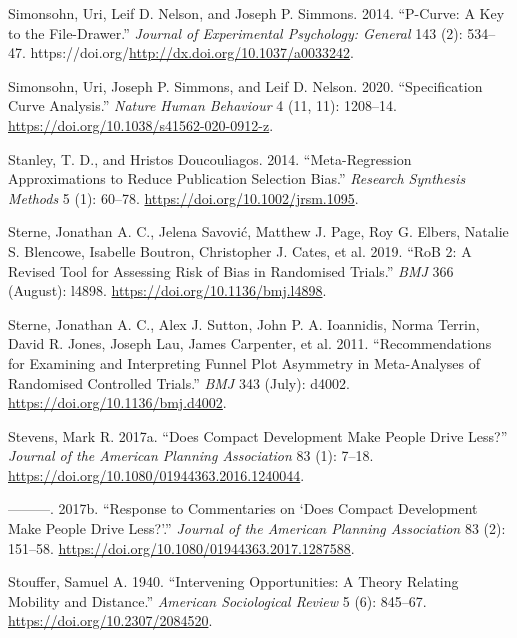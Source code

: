 \documentclass[
  11pt,
  openany]{memoir}
\newlength{\cslhangindent}
\newlength{\cslentryspacingunit} %
\newenvironment{CSLReferences}[2] %
 {%
  \setlength{\parindent}{0pt}
  \ifodd #1
  \let\oldpar\par
  \def\par{\hangindent=\cslhangindent\oldpar}
  \fi
  \setlength{\parskip}{#2\cslentryspacingunit}
 }%
 {}
\begin{document}
\begin{CSLReferences}{1}{0}
\leavevmode{}%
Simonsohn, Uri, Leif D. Nelson, and Joseph P. Simmons. 2014. {``P-Curve: A Key to the File-Drawer.''} \emph{Journal of Experimental Psychology: General} 143 (2): 534--47. https://doi.org/\url{http://dx.doi.org/10.1037/a0033242}.

\leavevmode{}%
Simonsohn, Uri, Joseph P. Simmons, and Leif D. Nelson. 2020. {``Specification Curve Analysis.''} \emph{Nature Human Behaviour} 4 (11, 11): 1208--14. \url{https://doi.org/10.1038/s41562-020-0912-z}.

\leavevmode{}%
Stanley, T. D., and Hristos Doucouliagos. 2014. {``Meta-Regression Approximations to Reduce Publication Selection Bias.''} \emph{Research Synthesis Methods} 5 (1): 60--78. \url{https://doi.org/10.1002/jrsm.1095}.

\leavevmode{}%
Sterne, Jonathan A. C., Jelena Savović, Matthew J. Page, Roy G. Elbers, Natalie S. Blencowe, Isabelle Boutron, Christopher J. Cates, et al. 2019. {``{RoB} 2: A Revised Tool for Assessing Risk of Bias in Randomised Trials.''} \emph{BMJ} 366 (August): l4898. \url{https://doi.org/10.1136/bmj.l4898}.

\leavevmode{}%
Sterne, Jonathan A. C., Alex J. Sutton, John P. A. Ioannidis, Norma Terrin, David R. Jones, Joseph Lau, James Carpenter, et al. 2011. {``Recommendations for Examining and Interpreting Funnel Plot Asymmetry in Meta-Analyses of Randomised Controlled Trials.''} \emph{BMJ} 343 (July): d4002. \url{https://doi.org/10.1136/bmj.d4002}.

\leavevmode{}%
Stevens, Mark R. 2017a. {``Does {Compact Development Make People Drive Less}?''} \emph{Journal of the American Planning Association} 83 (1): 7--18. \url{https://doi.org/10.1080/01944363.2016.1240044}.

\leavevmode{}%
---------. 2017b. {``Response to {Commentaries} on {`{Does Compact Development Make People Drive Less}?'}.''} \emph{Journal of the American Planning Association} 83 (2): 151--58. \url{https://doi.org/10.1080/01944363.2017.1287588}.

\leavevmode{}%
Stouffer, Samuel A. 1940. {``Intervening {Opportunities}: A {Theory Relating Mobility} and {Distance}.''} \emph{American Sociological Review} 5 (6): 845--67. \url{https://doi.org/10.2307/2084520}.


\end{CSLReferences}
\end{document}
